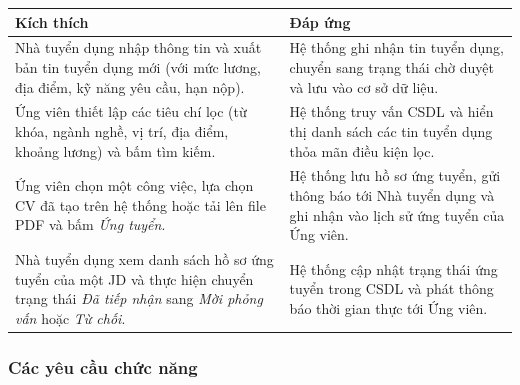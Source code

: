 \noindent
\begin{tabularx}{\textwidth}{|L{6cm}|X|}
    \hline
    \textbf{Kích thích} & \textbf{Đáp ứng} \\ \hline
    Nhà tuyển dụng nhập thông tin và xuất bản tin tuyển dụng mới (với mức lương, địa điểm, kỹ năng yêu cầu, hạn nộp). & Hệ thống ghi nhận tin tuyển dụng, chuyển sang trạng thái chờ duyệt và lưu vào cơ sở dữ liệu. \\ \hline
    Ứng viên thiết lập các tiêu chí lọc (từ khóa, ngành nghề, vị trí, địa điểm, khoảng lương) và bấm tìm kiếm. & Hệ thống truy vấn CSDL và hiển thị danh sách các tin tuyển dụng thỏa mãn điều kiện lọc. \\ \hline
    Ứng viên chọn một công việc, lựa chọn CV đã tạo trên hệ thống hoặc tải lên file PDF và bấm \textit{Ứng tuyển}. & Hệ thống lưu hồ sơ ứng tuyển, gửi thông báo tới Nhà tuyển dụng và ghi nhận vào lịch sử ứng tuyển của Ứng viên. \\ \hline
    Nhà tuyển dụng xem danh sách hồ sơ ứng tuyển của một JD và thực hiện chuyển trạng thái \textit{Đã tiếp nhận} sang \textit{Mời phỏng vấn} hoặc \textit{Từ chối}. & Hệ thống cập nhật trạng thái ứng tuyển trong CSDL và phát thông báo thời gian thực tới Ứng viên. \\ \hline
\end{tabularx}

\subsubsection{Các yêu cầu chức năng}

